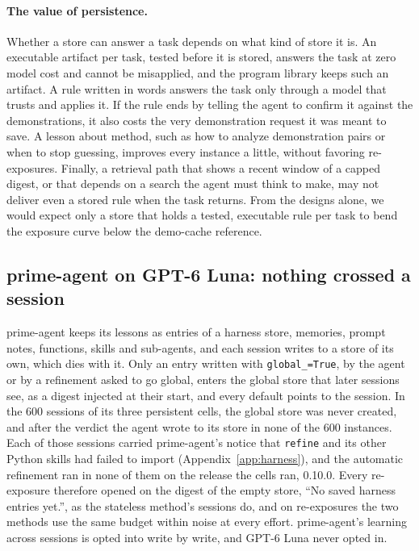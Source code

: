 \paragraph{The value of persistence.}
Whether a store can answer a task depends on what kind of store it is. An executable artifact per task, tested before it is stored, answers the task at zero model cost and cannot be misapplied, and the program library keeps such an artifact. A rule written in words answers the task only through a model that trusts and applies it. If the rule ends by telling the agent to confirm it against the demonstrations, it also costs the very demonstration request it was meant to save. A lesson about method, such as how to analyze demonstration pairs or when to stop guessing, improves every instance a little, without favoring re-exposures. Finally, a retrieval path that shows a recent window of a capped digest, or that depends on a search the agent must think to make, may not deliver even a stored rule when the task returns. From the designs alone, we would expect only a store that holds a tested, executable rule per task to bend the exposure curve below the demo-cache reference.

\subsection{prime-agent on GPT-6 Luna: nothing crossed a session}
\label{app:persist-prime}

prime-agent keeps its lessons as entries of a harness store, memories, prompt notes, functions, skills and sub-agents, and each session writes to a store of its own, which dies with it. Only an entry written with \texttt{global\_=True}, by the agent or by a refinement asked to go global, enters the global store that later sessions see, as a digest injected at their start, and every default points to the session. In the 600 sessions of its three persistent cells, the global store was never created, and after the verdict the agent wrote to its store in none of the 600 instances. Each of those sessions carried prime-agent's notice that \texttt{refine} and its other Python skills had failed to import (Appendix~\ref{app:harness}), and the automatic refinement ran in none of them on the release the cells ran, 0.10.0. Every re-exposure therefore opened on the digest of the empty store, ``No saved harness entries yet.'', as the stateless method's sessions do, and on re-exposures the two methods use the same budget within noise at every effort. prime-agent's learning across sessions is opted into write by write, and GPT-6 Luna never opted in.

